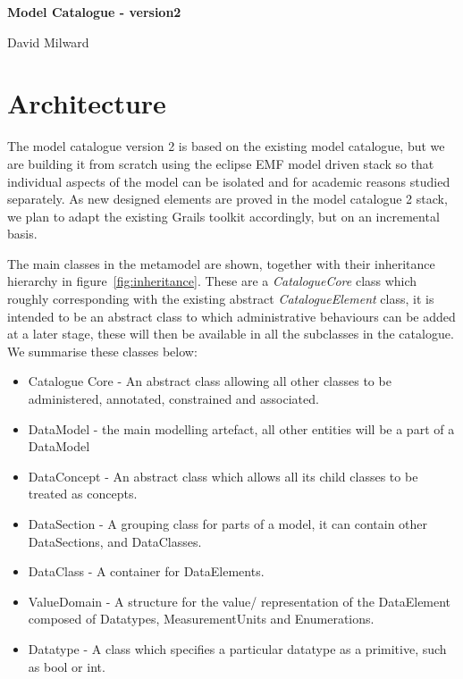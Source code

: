 \documentclass{article}
\begin{document}
 
\bgroup \parindent 0pt
{\Large\textbf{Model Catalogue - version2}}

\vskip 4mm 

{\Large {David Milward}}

\egroup

\vskip 14mm

\noindent

\section{Architecture}

The model catalogue version 2 is based on the existing model catalogue, but we are building it from scratch using the eclipse EMF model driven stack so that individual aspects of the model can be isolated and for academic reasons studied separately. As new designed elements are proved in the model catalogue 2 stack, we plan to adapt the existing Grails toolkit accordingly, but on an incremental basis.

The main classes in the metamodel are shown, together with their inheritance hierarchy in figure~\ref{fig:inheritance}. These are a \emph{CatalogueCore} class which roughly corresponding with the existing abstract \emph{CatalogueElement} class, it is intended to be an abstract class to which administrative behaviours can be added at a later stage, these will then be available in all the subclasses in the catalogue. We summarise these classes below:
\begin{itemize}
\item Catalogue Core - An abstract class allowing all other classes to be administered, annotated, constrained and associated.
\item DataModel - the main modelling artefact, all other entities will be a part of a DataModel
\item DataConcept - An abstract class which allows all its child classes to be treated as concepts.
\item DataSection - A grouping class for parts of a model, it can contain other DataSections, and DataClasses.
\item DataClass - A container for DataElements.
\item ValueDomain - A structure for the value/ representation of the DataElement composed of Datatypes, MeasurementUnits and Enumerations.
\item Datatype - A class which specifies a particular datatype as a primitive, such as bool or int.
\end{itemize}
\end{document}
